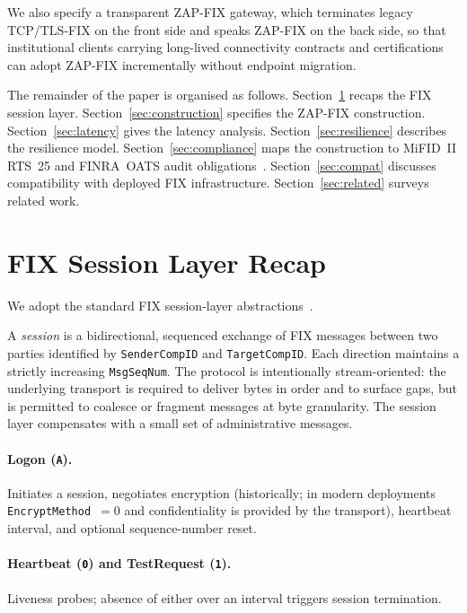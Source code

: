 \documentclass[11pt,a4paper]{article}
\begin{document}
We also specify a transparent ZAP-FIX gateway, which terminates
legacy TCP/TLS-FIX on the front side and speaks ZAP-FIX on the
back side, so that institutional clients carrying long-lived
connectivity contracts and certifications can adopt ZAP-FIX
incrementally without endpoint migration.

The remainder of the paper is organised as follows.
Section~\ref{sec:fix-recap} recaps the FIX session layer.
Section~\ref{sec:construction} specifies the ZAP-FIX construction.
Section~\ref{sec:latency} gives the latency analysis.
Section~\ref{sec:resilience} describes the resilience model.
Section~\ref{sec:compliance} maps the construction to MiFID~II RTS~25
and FINRA~OATS audit
obligations~\cite{rts25,finra-oats,finra-cat}.
Section~\ref{sec:compat} discusses compatibility with deployed FIX
infrastructure. Section~\ref{sec:related} surveys related work.

\section{FIX Session Layer Recap}
\label{sec:fix-recap}

We adopt the standard FIX session-layer
abstractions~\cite{fix44,fix50sp2}.

A \emph{session} is a bidirectional, sequenced exchange of FIX
messages between two parties identified by \texttt{SenderCompID} and
\texttt{TargetCompID}. Each direction maintains a strictly
increasing \texttt{MsgSeqNum}. The protocol is intentionally
stream-oriented: the underlying transport is required to deliver
bytes in order and to surface gaps, but is permitted to coalesce or
fragment messages at byte granularity. The session layer compensates
with a small set of administrative messages.

\paragraph{Logon (\texttt{A}).}
Initiates a session, negotiates encryption (historically; in modern
deployments \texttt{EncryptMethod}~$=0$ and confidentiality is
provided by the transport), heartbeat interval, and optional
sequence-number reset.

\paragraph{Heartbeat (\texttt{0}) and TestRequest (\texttt{1}).}
Liveness probes; absence of either over an interval triggers session
termination.
\end{document}
